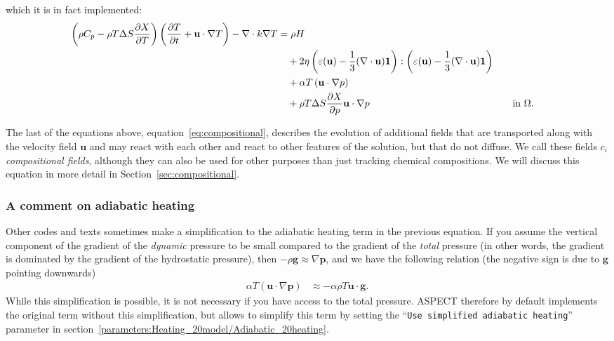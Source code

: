 \documentclass{article}
\newcommand{\aspect}{\textsc{ASPECT}}
\begin{document}
which it is in fact implemented:
\begin{align}
  \label{eq:temperature-reformulated}
  \left(\rho C_p - \rho T \Delta S \frac{\partial X}{\partial T}\right)
  \left(\frac{\partial T}{\partial t} + \mathbf u\cdot\nabla
  T\right) - \nabla\cdot k\nabla T
  &=
  \rho H
  \notag
  \\
  &\quad
  +
  2\eta
  \left(\varepsilon(\mathbf u) - \frac{1}{3}(\nabla \cdot \mathbf u)\mathbf 1\right)
  :
  \left(\varepsilon(\mathbf u) - \frac{1}{3}(\nabla \cdot \mathbf u)\mathbf 1\right)
  \\
  &\quad
  +\alpha T \left( \mathbf u \cdot \nabla p \right)
  \notag
  \\
  &\quad
  + \rho T \Delta S \frac{\partial X}{\partial p} \mathbf u\cdot\nabla p
  & \quad & \textrm{in $\Omega$}.
  \notag
\end{align}

The last of the equations above, equation~\eqref{eq:compositional}, describes
the evolution of additional fields that are transported along with the
velocity field $\mathbf u$ and may react with each other and react to other
features of the solution, but that do not diffuse. We call these fields $c_i$
\textit{compositional fields}, although they can also be used for other
purposes than just tracking chemical compositions. We will discuss this
equation in more detail in Section~\ref{sec:compositional}.

\subsubsection{A comment on adiabatic heating}
Other codes and texts sometimes make a simplification to the adiabatic heating
term in the previous equation. If you assume the vertical component of the
gradient of the \textit{dynamic} pressure to be small compared to the gradient
of the \textit{total} pressure (in other words, the gradient is dominated by
the gradient of the hydrostatic pressure), then $ -\rho \mathbf g \approx
\nabla \mathbf{p} $, and we have the following relation (the negative sign is
due to $\mathbf g$ pointing downwards)
\begin{align*}
\alpha T \left( \mathbf u \cdot \nabla \mathbf p \right)
  & \approx -\alpha \rho T \mathbf u \cdot \mathbf g.
\end{align*}
While this simplification is possible, it is not necessary if you have access
to the total pressure. \aspect{} therefore by default implements the original
term without this simplification, but allows to simplify this term by setting
the ``\texttt{Use simplified adiabatic heating}''
parameter in section~\ref{parameters:Heating_20model/Adiabatic_20heating}.
\end{document}
